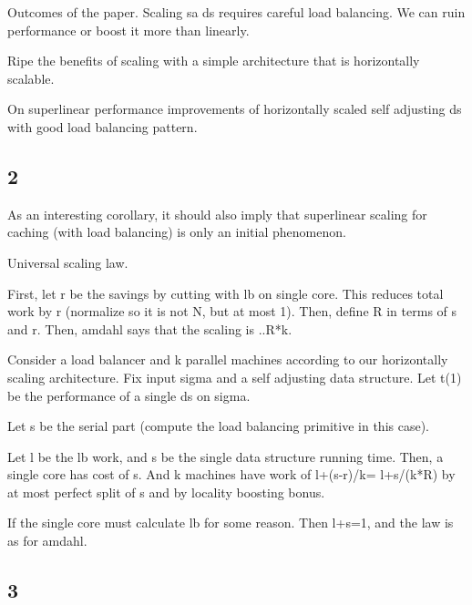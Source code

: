 Outcomes of the paper. Scaling sa ds requires careful load balancing. We can ruin performance or boost it more than linearly.

Ripe the benefits of scaling with a simple architecture that is horizontally scalable.



On superlinear performance improvements of horizontally scaled self adjusting ds with good load balancing pattern.


\subsection{2}





As an interesting corollary, it should also imply that superlinear scaling for caching (with load balancing) is only an initial phenomenon.







Universal scaling law.

First, let r be the savings by cutting with lb on single core. This reduces total work by r (normalize so it is not N, but at most 1). Then, define R in terms of s and r. Then, amdahl says that the scaling is ..R*k.


Consider a load balancer and k parallel machines according to our horizontally scaling architecture. Fix input sigma and a self adjusting data structure. Let t(1) be the performance of a single ds on sigma.




Let s be the serial part (compute the load balancing primitive in this case).




Let l be the lb work, and s be the single data structure running time. Then, a single core has cost of s. And k machines have work of l+(s-r)/k= l+s/(k*R) by at most perfect split of s and by locality boosting bonus.

If the single core must calculate lb for some reason. Then l+s=1, and the law is as for amdahl.


\subsection{3}



